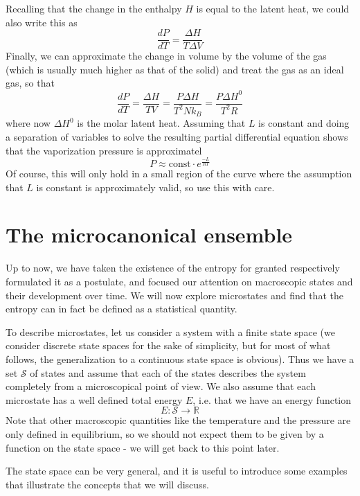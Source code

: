 \documentclass[a4paper, draft]{article}
\theoremstyle{own}
\theoremstyle{remark}
\newcommand{\R}{\mathbb{R}}
\begin{document}
Recalling that the change in the enthalpy $H$ is equal to the latent heat, we could also write this as
$$
\frac{dP}{dT} = \frac{\Delta H}{T \Delta V} 
$$
Finally, we can approximate the change in volume by the volume of the gas (which is usually much higher as that of the solid) and treat the gas as an ideal gas, so that 
$$
\frac{dP}{dT} = \frac{\Delta H}{T  V} =  \frac{P \Delta H}{T^2 N k_B } = \frac{P \Delta H^0}{T^2 R }
$$
where now $\Delta H^0$ is the molar latent heat. Assuming that $L$ is constant and doing a separation of variables to solve the resulting partial differential equation shows that the vaporization pressure is approximatel
$$
P \approx \text{const} \cdot e^{\frac{-L}{RT}}
$$
Of course, this will only hold in a small region of the curve where the assumption that $L$ is constant is approximately valid, so use this with care.


\section{The microcanonical ensemble}

Up to now, we have taken the existence of the entropy for granted respectively formulated it as a postulate, and focused our attention on macroscopic states and their development over time. We will now explore microstates and find that the entropy can in fact be defined as a statistical quantity. 

To describe microstates, let us consider a system with a finite state space (we consider discrete state spaces for the sake of simplicity, but for most of what follows, the generalization to a continuous state space is obvious). Thus we have a set
${\mathcal S}$ of states and assume that each of the states describes the system completely from a microscopical point of view. We also assume that each microstate has a well defined total energy $E$, i.e. that we have an energy function 
$$
E \colon {\mathcal S} \rightarrow \R
$$
Note that other macroscopic quantities like the temperature and the pressure are only defined in equilibrium, so we should not expect them to be given by a function on the state space - we will get back to this point later.

The state space can be very general, and it is useful to introduce some examples that illustrate the concepts that we will discuss.
\end{document}

